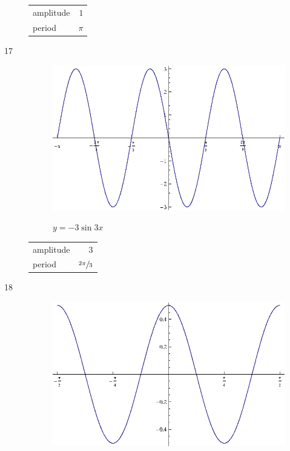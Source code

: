 \documentclass{exam}
\begin{document}
\begin{description}
        \begin{tabular}[H]{lr}
          \toprule
          amplitude & $1$ \\
          period    & $\pi$ \\
          \bottomrule
        \end{tabular}

      \item[17]
        \begin{figure}[H]
          \centering
          \includegraphics[scale=0.9]{exercise17.eps}

          $y = - 3 \sin 3x$
        \end{figure}

        \begin{tabular}[H]{lr}
          \toprule
          amplitude & $3$ \\
          period    & $\sfrac{2 \pi}{3}$ \\
          \bottomrule
        \end{tabular}

      \item[18]
        \begin{figure}[H]
          \centering
          \includegraphics[scale=0.9]{exercise18.eps}


\end{figure}
\end{description}
\end{document}
